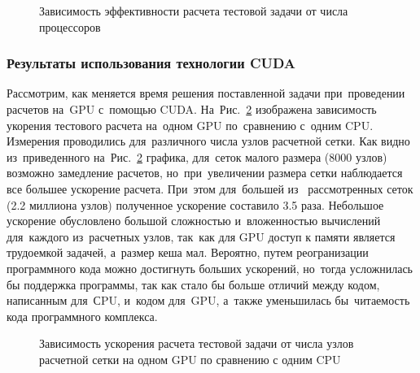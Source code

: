 \begin{figure}[!h]
\begin{center}
\caption{Зависимость эффективности расчета тестовой задачи от числа процессоров}
\label{mpi_eff}
\end{center}
\end{figure}


\subsubsection{Результаты использования технологии CUDA}

Рассмотрим, как меняется время решения поставленной задачи при~проведении расчетов на~GPU
с~помощью CUDA. На~Рис.~\ref{cuda_speedup} изображена зависимость укорения тестового расчета на~одном GPU
по~сравнению с~одним CPU. Измерения проводились для~различного числа
узлов расчетной сетки. Как видно из~приведенного на~Рис.~\ref{cuda_speedup}
графика, для~сеток малого размера (8000 узлов) возможно замедление расчетов, но~при~увеличении
размера сетки наблюдается все большее ускорение расчета. При~этом для~большей из~
рассмотренных сеток (2.2 миллиона узлов) полученное ускорение составило 3.5 раза. Небольшое
ускорение обусловлено большой сложностью и~вложенностью вычислений для~каждого из~расчетных
узлов, так~как для GPU доступ к памяти является трудоемкой задачей, а~размер кеша мал. Вероятно,
путем реогранизации программного кода можно достигнуть больших ускорений, но~тогда усложнилась
бы поддержка программы, так как стало бы больше отличий между кодом, написанным для~СPU, и~кодом
для~GPU, а~также уменьшилась бы~читаемость кода программного комплекса.

\begin{figure}[!h]
\begin{center}
\caption{Зависимость ускорения расчета тестовой задачи от числа узлов расчетной сетки на одном GPU по сравнению с одним CPU}
\label{cuda_speedup}
\end{center}
\end{figure}

